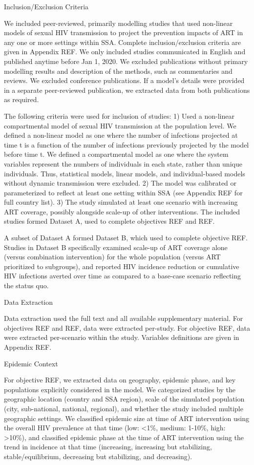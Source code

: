 Inclusion/Exclusion Criteria

We included peer-reviewed, primarily modelling studies that used non-linear models of sexual HIV transmission
to project the prevention impacts of ART in any one or more settings within SSA.
Complete inclusion/exclusion criteria are given in Appendix REF.
We only included studies communicated in English and published anytime before Jan 1, 2020.
We excluded publications without primary modelling results and description of the methods,
such as commentaries and reviews.
We excluded conference publications.
If a model's details were provided in a separate peer-reviewed publication,
we extracted data from both publications as required.

The following criteria were used for inclusion of studies:
1) Used a non-linear compartmental model of
sexual HIV transmission at the population level.
We defined a non-linear model as one where
the number of infections projected at time t is a function of
the number of infections previously projected by the model before time t.
We defined a compartmental model as one where
the system variables represent the numbers of individuals in each state,
rather than unique individuals.
Thus, statistical models, linear models, and individual-based models without dynamic transmission were excluded.
2) The model was calibrated or parameterized to reflect at least one setting within SSA
(see Appendix REF for full country list).
3) The study simulated at least one scenario with increasing ART coverage,
possibly alongside scale-up of other interventions.
The included studies formed Dataset A,
used to complete objectives REF and REF.

A subset of Dataset A formed Dataset B,
which used to complete objective REF.
Studies in Dataset B specifically examined
scale-up of ART coverage alone (versus combination intervention)
for the whole population (versus ART prioritized to subgroups),
and reported HIV incidence reduction or cumulative HIV infections averted over time 
as compared to a base-case scenario reflecting the status quo.

Data Extraction

Data extraction used the full text and all available supplementary material.
For objectives REF and REF, data were extracted per-study.
For objective REF, data were extracted per-scenario within the study.
Variables definitions are given in Appendix REF.

Epidemic Context

For objective REF, we extracted data on
geography, epidemic phase, and key populations explicitly considered in the model.
We categorized studies by the geographic location (country and SSA region),
scale of the simulated population (city, sub-national, national, regional), and
whether the study included multiple geographic settings.
We classified epidemic size at time of ART intervention using
the overall HIV prevalence at that time (low: <1\%, medium: 1-10\%, high: >10\%),
and classified epidemic phase at the time of ART intervention
using the trend in incidence at that time
(increasing, increasing but stabilizing, stable/equilibrium, decreasing but stabilizing, and decreasing).

